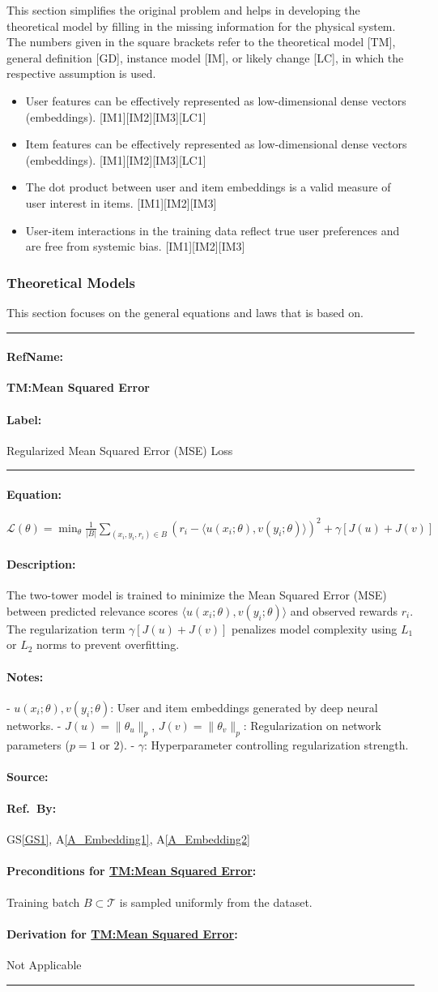 \documentclass[12pt]{article}
\newcounter{assumpnum} %
\newcommand{\aref}[1]{A\ref{#1}}
\newcommand{\gsref}[1]{GS\ref{#1}}
\newcommand{\deftheory}[9][Not Applicable]
{
\newpage
\noindent \rule{\textwidth}{0.5mm}

\paragraph{RefName: } \textbf{#2} \phantomsection 
\label{#2}

\paragraph{Label:} #3

\noindent \rule{\textwidth}{0.5mm}

\paragraph{Equation:}

#4

\paragraph{Description:}

#5

\paragraph{Notes:}

#6

\paragraph{Source:}

#7

\paragraph{Ref.\ By:}

#8

\paragraph{Preconditions for \hyperref[#2]{#2}:}
\label{#2_precond}

#9

\paragraph{Derivation for \hyperref[#2]{#2}:}
\label{#2_deriv}

#1

\noindent \rule{\textwidth}{0.5mm}

}
\begin{document}
This section simplifies the original problem and helps in developing the
theoretical model by filling in the missing information for the physical system.
The numbers given in the square brackets refer to the theoretical model [TM],
general definition [GD], instance model [IM], or likely
change [LC], in which the respective assumption is used.

\begin{itemize}

\item[A\refstepcounter{assumpnum}\theassumpnum \label{A_Embedding1}:]
User features can be effectively represented as low-dimensional dense vectors (embeddings). [IM1][IM2][IM3][LC1]

\item[A\refstepcounter{assumpnum}\theassumpnum \label{A_Embedding2}:]
Item features can be effectively represented as low-dimensional dense vectors (embeddings). [IM1][IM2][IM3][LC1]


\item[A\refstepcounter{assumpnum}\theassumpnum \label{A_DotProduct}:]
The dot product between user and item embeddings is a valid measure of user interest in items. [IM1][IM2][IM3]

\item[A\refstepcounter{assumpnum}\theassumpnum \label{A_DataQuality}:]
User-item interactions in the training data reflect true user preferences and are free from systemic bias. [IM1][IM2][IM3]
\end{itemize}

\subsubsection{Theoretical Models}\label{sec_theoretical}
This section focuses on the general equations and laws that \progname{} is based
on. 
\deftheory
{TM:Mean Squared Error}
{Regularized Mean Squared Error (MSE) Loss}
{
  $\displaystyle \mathcal{L}(\theta)=\min_{\theta} \frac{1}{|B|} \sum_{(x_i, y_i, r_i) \in B} \left(r_i - \langle u(x_i; \theta), v(y_i; \theta) \rangle \right)^2 + \gamma \left[ J(u) + J(v) \right]$
}
{
  The two-tower model is trained to minimize the Mean Squared Error (MSE) between predicted relevance scores $\langle u(x_i; \theta), v(y_i; \theta) \rangle$ and observed rewards $r_i$. The regularization term $\gamma \left[ J(u) + J(v) \right]$ penalizes model complexity using $L_1$ or $L_2$ norms to prevent overfitting.
}
{
  - $u(x_i; \theta), v(y_i; \theta)$: User and item embeddings generated by deep neural networks.  
  - $J(u) = \|\theta_u\|_p$, $J(v) = \|\theta_v\|_p$: Regularization on network parameters ($p=1$ or $2$).  
  - $\gamma$: Hyperparameter controlling regularization strength.  
}
{
  \cite{wiki:Mean_squared_error}
}
{
  \gsref{GS1}, \aref{A_Embedding1}, \aref{A_Embedding2}
}
{
  Training batch $B \subset \mathcal{T}$ is sampled uniformly from the dataset.
}
{}
\end{document}
